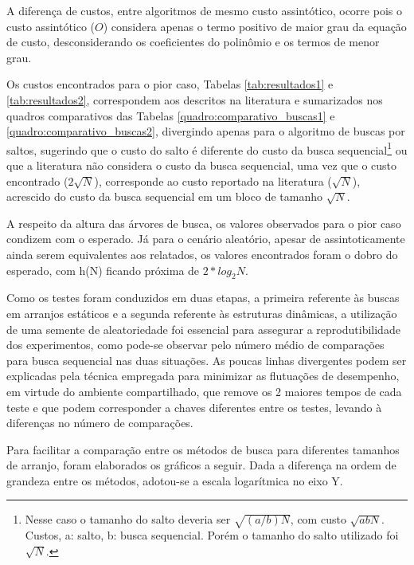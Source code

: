 \documentclass[12pt]{article}
\begin{document}
A diferença de custos, entre algoritmos de mesmo custo assintótico, ocorre pois o custo assintótico ($O$) considera apenas o termo positivo de maior grau da equação de custo, desconsiderando os coeficientes do polinômio e os termos de menor grau.

Os custos encontrados para o pior caso, Tabelas \ref{tab:resultados1} e \ref{tab:resultados2}, correspondem aos descritos na literatura e sumarizados nos quadros comparativos das Tabelas \ref{quadro:comparativo_buscas1} e \ref{quadro:comparativo_buscas2}, divergindo apenas para o algoritmo de buscas por saltos, sugerindo que o custo do salto é diferente do custo da busca sequencial\footnote{Nesse caso o tamanho do salto deveria ser $\sqrt{(a/b)N}$, com custo $\sqrt{abN}$. Custos, a: salto, b: busca sequencial. Porém o tamanho do salto utilizado foi $\sqrt{N}$.} ou que a literatura não considera o custo da busca sequencial, uma vez que o custo encontrado ($2\sqrt{N}$), corresponde ao custo reportado na literatura ($\sqrt{N}$), acrescido do custo da busca sequencial em um bloco de tamanho $\sqrt{N}$.

A respeito da altura das árvores de busca, os valores observados para o pior caso condizem com o esperado. Já para o cenário aleatório, apesar de assintoticamente ainda serem equivalentes aos relatados, os valores encontrados foram o dobro do esperado, com h(N) ficando próxima de $2*log_{2} N$.

Como os testes foram conduzidos em duas etapas, a primeira referente às buscas em arranjos estáticos e a segunda referente às estruturas dinâmicas, a utilização de uma semente de aleatoriedade foi essencial para assegurar
a reprodutibilidade dos experimentos, como pode-se observar pelo número médio de comparações para busca sequencial nas duas situações. As poucas linhas divergentes podem ser explicadas pela técnica empregada para minimizar as flutuações de desempenho, em virtude do ambiente compartilhado, que remove os 2 maiores tempos de cada teste e que podem corresponder a chaves diferentes entre os testes, levando à diferenças no número de comparações.

Para facilitar a comparação entre os métodos de busca para diferentes tamanhos de arranjo, foram elaborados os gráficos a seguir. Dada a diferença na ordem de grandeza entre os métodos, adotou-se a escala logarítmica no eixo Y.
\end{document}
